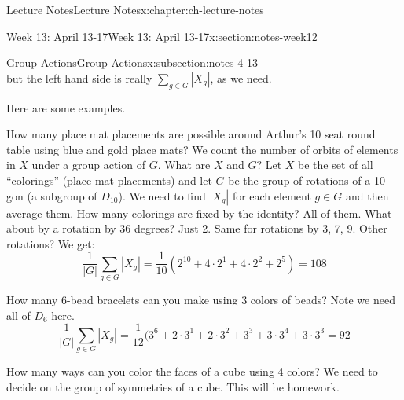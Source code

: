 \documentclass[oneside,11pt,]{book}
\begin{document}
\begin{chapterptx}{Lecture Notes}{}{Lecture Notes}{}{}{x:chapter:ch-lecture-notes}
\begin{sectionptx}{Week 13: April 13-17}{}{Week 13: April 13-17}{}{}{x:section:notes-week12}
\begin{subsectionptx}{Group Actions}{}{Group Actions}{}{}{x:subsection:notes-4-13}
\begin{equation*}
\end{equation*}
but the left hand side is really \(\sum_{g\in G} |X_g|\), as we need.%
\par
Here are some examples.%
\par
How many place mat placements are possible around Arthur’s 10 seat round table using blue and gold place mats? We count the number of orbits of elements in \(X\) under a group action of \(G\). What are \(X\) and \(G\)? Let \(X\) be the set of all ``colorings'' (place mat placements) and let \(G\) be the group of rotations of a 10-gon (a subgroup of \(D_{10}\)). We need to find \(|X_g|\) for each element \(g \in G\) and then average them. How many colorings are fixed by the identity? All of them. What about by a rotation by 36 degrees? Just 2. Same for rotations by 3, 7, 9. Other rotations? We get:%
\begin{equation*}
\frac{1}{|G|}\sum_{g \in G}|X_g| = \frac{1}{10}(2^{10} + 4\cdot 2^1 + 4\cdot 2^2 + 2^5) = 108
\end{equation*}
%
\par
How many 6-bead bracelets can you make using 3 colors of beads? Note we need all of \(D_6\) here.%
\begin{equation*}
\frac{1}{|G|}\sum_{g \in G}|X_g| = \frac{1}{12}(3^6+2\cdot 3^1 + 2\cdot 3^2 + 3^3 + 3\cdot 3^4 + 3\cdot 3^3 = 92
\end{equation*}
%
\par
How many ways can you color the faces of a cube using 4 colors? We need to decide on the group of symmetries of a cube. This will be homework.%
\end{subsectionptx}
\end{sectionptx}
\end{chapterptx}
\end{document}
